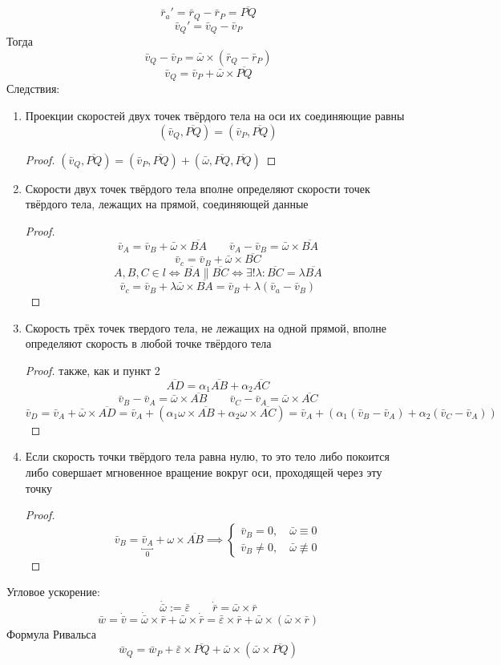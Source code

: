 \documentclass[crop=false]{standalone}
\begin{document}
\[\bar r_a' = \bar r_Q - \bar r_P = \overline{PQ}\]
\[\bar v_Q' = \bar v_Q - \bar v_P\]
Тогда
\[\bar v_Q - \bar v_P = \bar \omega \times (\bar r_Q - \bar r_P)\] 
\[\boxed{\bar v_Q = \bar v_P + \bar \omega \times \overline{PQ}}\]
Следствия: %
\begin{enumerate}
\item Проекции скоростей двух точек твёрдого тела на оси их соединяющие равны
\[(\bar v_Q , \overline{PQ}) = (\bar v_P , \overline{PQ})\]
\begin{proof}
    $(\bar v_Q , \overline{PQ}) = (\bar v_P , \overline{PQ}) + (\bar \omega, \overline{PQ}, \overline{PQ})$
\end{proof}
\item
Скорости двух точек твёрдого тела вполне определяют скорости точек твёрдого тела, лежащих на прямой, соединяющей данные 
\begin{proof}
    \[\bar v_A = \bar v_B + \bar \omega \times \overline{BA} \qquad \bar v_A - \bar v_B = \bar \omega \times \overline{BA}\]
    \[\bar v_c = \bar v_B + \bar \omega \times \overline{BC}\]
    \[A, B, C \in l \iff \overline{BA} \| \overline{BC} \iff \exists! \lambda: \overline{BC} = \lambda \overline{BA}\]
    \[\bar v_c = \bar v_B + \lambda \bar \omega \times \overline{BA} = \bar v_B + \lambda \left(\bar v_a - \bar v_B\right)\]
\end{proof}
\item
Скорость трёх точек твердого тела, не лежащих на одной прямой, вполне определяют скорость в любой точке твёрдого тела
\begin{proof}
    также, как и пункт 2
    \[\overline{AD} = \alpha_1 \overline{AB} + \alpha_2 \overline{AC}\]
    \[\bar v_B - \bar v_A = \bar \omega \times \overline{AB} \qquad \bar v_C - \bar v_A = \bar \omega \times \overline{AC}\]
    \[\bar v_D = \bar v_A + \bar \omega \times \overline{AD} = \bar v_A + \left( \alpha_1 \omega \times \overline{AB} + \alpha_2 \omega \times \overline{AC}\right) = \bar v_A + \left(\alpha_1 \left( \bar v_B - \bar v_A \right) + \alpha_2 \left(\bar v_C - \bar v_A\right)\right)\]
\end{proof}
\item
Если скорость точки твёрдого тела равна нулю, то это тело либо покоится либо совершает мгновенное вращение вокруг оси, проходящей через эту точку
\begin{proof}
    \[\bar v_B = \underbracket{\bar v_A}_0 + \omega \times \overline{AB} \implies \begin{cases}
        \bar v_B = 0 , \quad\bar \omega \equiv 0 \\
        \bar v_B \neq 0 , \quad \bar \omega \not \equiv 0
    \end{cases} \]
\end{proof}
\end{enumerate}
\keypoint 
Угловое ускорение:
\[\dot{\bar \omega} := \bar \varepsilon \qquad \dot {\bar r} = \bar \omega \times \bar r\]
\[\bar w = \dot{\bar v} = \dot{\bar \omega} \times \bar r + \bar \omega \times \dot{\bar r} = \bar \varepsilon \times \bar r + \bar \omega \times (\bar \omega \times \bar r)\]
Формула Ривальса
\[
\boxed{
\bar w_Q = \bar w_P + \bar \varepsilon \times \overline{PQ} + \bar \omega \times (\bar \omega \times \overline{PQ})
}\]
\end{document}
